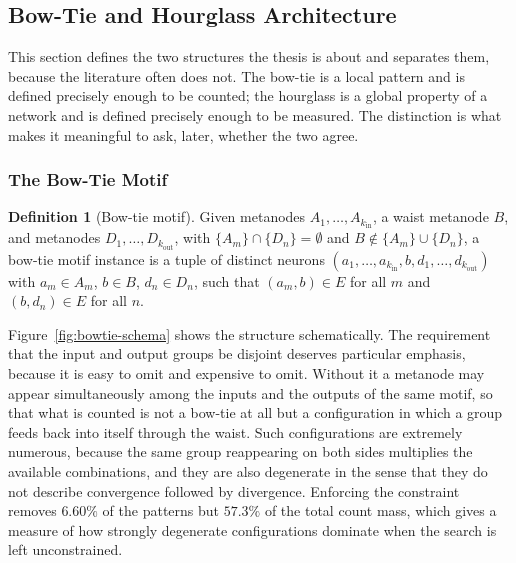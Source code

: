 \documentclass[12pt,a4paper,oneside]{article}
\theoremstyle{definition}
\newtheorem{definition}{Definition}[section]
\theoremstyle{plain}
\newcommand{\kin}{k_{\mathrm{in}}}
\newcommand{\kout}{k_{\mathrm{out}}}
\begin{document}
\subsection{Bow-Tie and Hourglass Architecture}
\label{sec:hourglass-theory}


This section defines the two structures the thesis is about and separates
them, because the literature often does not. The bow-tie is a local pattern
and is defined precisely enough to be counted; the hourglass is a global
property of a network and is defined precisely enough to be measured. The
distinction is what makes it meaningful to ask, later, whether the two
agree.

\subsubsection{The Bow-Tie Motif}

\begin{definition}[Bow-tie motif]
\label{def:bowtie}
Given metanodes $A_1,\dots,A_{\kin}$, a waist metanode $B$, and metanodes
$D_1,\dots,D_{\kout}$, with
$\{A_m\} \cap \{D_n\} = \emptyset$ and $B \notin \{A_m\} \cup \{D_n\}$, a
bow-tie motif instance is a tuple of distinct neurons
$(a_1,\dots,a_{\kin}, b, d_1,\dots,d_{\kout})$ with $a_m \in A_m$,
$b \in B$, $d_n \in D_n$, such that $(a_m, b) \in E$ for all $m$ and
$(b, d_n) \in E$ for all $n$.
\end{definition}

Figure~\ref{fig:bowtie-schema} shows the structure schematically. The
requirement that the input and output groups be disjoint deserves particular
emphasis, because it is easy to omit and expensive to omit. Without it a
metanode may appear simultaneously among the inputs and the outputs of the
same motif, so that what is counted is not a bow-tie at all but a
configuration in which a group feeds back into itself through the waist.
Such configurations are extremely numerous, because the same group
reappearing on both sides multiplies the available combinations, and they
are also degenerate in the sense that they do not describe convergence
followed by divergence. Enforcing the constraint removes $6.60\%$ of the patterns but $57.3\%$ of
the total count mass, which gives a measure of how strongly degenerate
configurations dominate when the search is left unconstrained.
\end{document}
